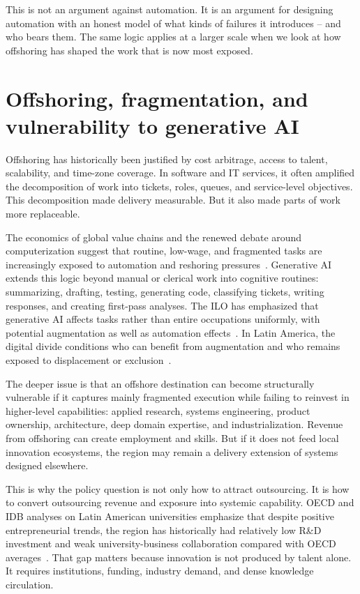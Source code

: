 \documentclass[11pt,a4paper]{article}
\begin{document}
This is not an argument against automation. It is an argument for designing automation with an honest model of what kinds of failures it introduces -- and who bears them. The same logic applies at a larger scale when we look at how offshoring has shaped the work that is now most exposed.

\section{Offshoring, fragmentation, and vulnerability to generative AI}
Offshoring has historically been justified by cost arbitrage, access to talent, scalability, and time-zone coverage. In software and IT services, it often amplified the decomposition of work into tickets, roles, queues, and service-level objectives. This decomposition made delivery measurable. But it also made parts of work more replaceable.

The economics of global value chains and the renewed debate around computerization suggest that routine, low-wage, and fragmented tasks are increasingly exposed to automation and reshoring pressures \,\citep{antras2020deglobalisation,hidalgo_micco_2024}. Generative AI extends this logic beyond manual or clerical work into cognitive routines: summarizing, drafting, testing, generating code, classifying tickets, writing responses, and creating first-pass analyses. The ILO has emphasized that generative AI affects tasks rather than entire occupations uniformly, with potential augmentation as well as automation effects \,\citep{ilo_2023_generative_ai}. In Latin America, the digital divide conditions who can benefit from augmentation and who remains exposed to displacement or exclusion \,\citep{gmyrek2024buffer}.

The deeper issue is that an offshore destination can become structurally vulnerable if it captures mainly fragmented execution while failing to reinvest in higher-level capabilities: applied research, systems engineering, product ownership, architecture, deep domain expertise, and industrialization. Revenue from offshoring can create employment and skills. But if it does not feed local innovation ecosystems, the region may remain a delivery extension of systems designed elsewhere.

This is why the policy question is not only how to attract outsourcing. It is how to convert outsourcing revenue and exposure into systemic capability. OECD and IDB analyses on Latin American universities emphasize that despite positive entrepreneurial trends, the region has historically had relatively low R\&D investment and weak university-business collaboration compared with OECD averages \,\citep{oecd_idb_2022_universities}. That gap matters because innovation is not produced by talent alone. It requires institutions, funding, industry demand, and dense knowledge circulation.
\end{document}
